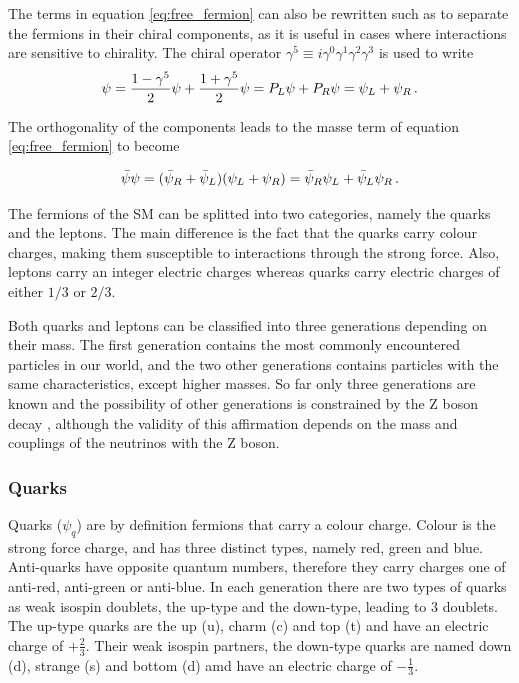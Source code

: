 The terms in equation \ref{eq:free_fermion} can also be rewritten such as to separate the fermions in their chiral components, as it is useful in cases where interactions are sensitive to chirality. The chiral operator $\gamma^5 \equiv i\gamma^0 \gamma^1 \gamma^2 \gamma^3$ is used to write
\begin{equation}
    \psi = \frac{1- \gamma^5}{2}\psi + \frac{1+ \gamma^5}{2}\psi = P_L \psi + P_R \psi = \psi_L + \psi_R \mend
\end{equation}

The orthogonality of the components leads to the masse term of equation \ref{eq:free_fermion} to become

\begin{equation}
    \Bar{\psi}\psi = (\Bar{\psi}_R + \Bar{\psi}_L)(\psi_L + \psi_R) = \Bar{\psi}_R \psi_L + \Bar{\psi}_L \psi_R \mend
    \label{eq:chiral_fermions}
\end{equation}

The fermions of the SM can be splitted into two categories, namely the quarks and the leptons. The main difference is the fact that the quarks carry colour charges, making them susceptible to interactions through the strong force. Also, leptons carry an integer electric charges whereas quarks carry electric charges of either $1/3$ or $2/3$.

Both quarks and leptons can be classified into three generations depending on their mass. The first generation contains the most commonly encountered particles in our world, and the two other generations contains particles with the same characteristics, except higher masses. So far only three generations are known and the possibility of other generations is constrained by the Z boson decay \cite{2006257}, although the validity of this affirmation depends on the mass and couplings of the neutrinos with the Z boson.

\subsubsection{Quarks}

Quarks ($\psi_q$) are by definition fermions that carry a colour charge. Colour is the strong force charge, and has three distinct types, namely red, green and blue. Anti-quarks have opposite quantum numbers, therefore they carry charges one of anti-red, anti-green or anti-blue. In each generation there are two types of quarks as weak isospin doublets, the up-type and the down-type, leading to 3 doublets. The up-type quarks are the up (u), charm (c) and top (t) and have an electric charge of $+\frac{2}{3}$. Their weak isospin partners, the down-type quarks are named down (d), strange (s) and bottom (d) amd have an electric charge of $-\frac{1}{3}$.

